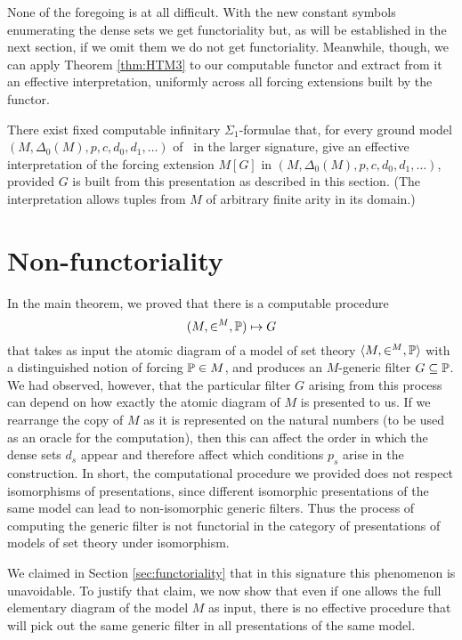 \documentclass{amsart}
\begin{document}
None of the foregoing is at all difficult. With the new constant symbols enumerating the dense sets we get functoriality but, as will be established in the next section, if we omit them we do not get functoriality.
Meanwhile, though, we can apply Theorem \ref{thm:HTM3} to our computable functor and extract
from it an effective interpretation, uniformly across all forcing extensions built by the functor.

\begin{corollary}
\label{cor:interpretations}
There exist fixed computable infinitary $\Sigma_1$-formulae that,
for every ground model
$(M, \Delta_0(M),p,c,d_0,d_1,\ldots)$ of \ZFC\ in the larger signature,
give an effective interpretation of the forcing extension $M[G]$
in $(M, \Delta_0(M),p,c,d_0,d_1,\ldots)$, provided
$G$ is built from this presentation as described in this section.
(The interpretation allows tuples from $M$ of arbitrary finite arity in its domain.)
\end{corollary}



\section{Non-functoriality}\label{Section.Non-functoriality}

In the main theorem, we proved that there is a computable procedure
 $$(M,\in^M,\P)\mapsto G$$
that takes as input the atomic diagram of a model of set theory $\<M,\in^M,\P>$ with a distinguished notion of forcing $\P\in M$, and produces an $M$-generic filter $G\of\P$. We had observed, however, that the particular filter $G$ arising from this process can depend on how exactly the atomic diagram of $M$ is presented to us. If we rearrange the copy of $M$ as it is represented on the natural numbers (to be used as an oracle for the computation), then this can affect the order in which the dense sets $d_s$ appear and therefore affect which conditions $p_s$ arise in the construction. In short, the computational procedure we provided does not respect isomorphisms of presentations, since different isomorphic presentations of the same model can lead to non-isomorphic generic filters. Thus the process of computing the generic filter is not functorial in the category of presentations of models of set theory under isomorphism.

We claimed in Section \ref{sec:functoriality} that in this signature this phenomenon is unavoidable. To justify that claim, we now show that even if one allows the full elementary diagram of the model $M$ as input, there is no effective procedure that will pick out the same generic filter in all presentations of the same model.
\end{document}
